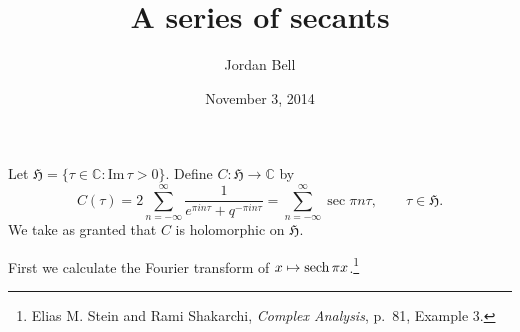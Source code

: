 \documentclass{article}
\def\Im{\ensuremath{\mathrm{Im}}\,}
\newcommand{\sech}{\ensuremath\mathrm{sech}\,}
\theoremstyle{definition}
\begin{document}
\title{A series of  secants}
\author{Jordan Bell}
\date{November 3, 2014}

\maketitle

Let $\mathfrak{H}=\{\tau \in \mathbb{C}: \Im \tau >0\}$. Define $C:\mathfrak{H} \to \mathbb{C}$ by
\[
C(\tau) = 2 \sum_{n=-\infty}^\infty \frac{1}{e^{\pi i n\tau}+q^{-\pi i n\tau}}
=\sum_{n=-\infty}^\infty \sec \pi n \tau, \qquad \tau \in \mathfrak{H}.
\]
We take as granted that $C$ is holomorphic on $\mathfrak{H}$. 


First we calculate the Fourier transform of $x \mapsto \sech \pi x$.\footnote{Elias M. Stein and Rami Shakarchi, {\em Complex Analysis},
p.~81, Example 3.}
\end{document}
